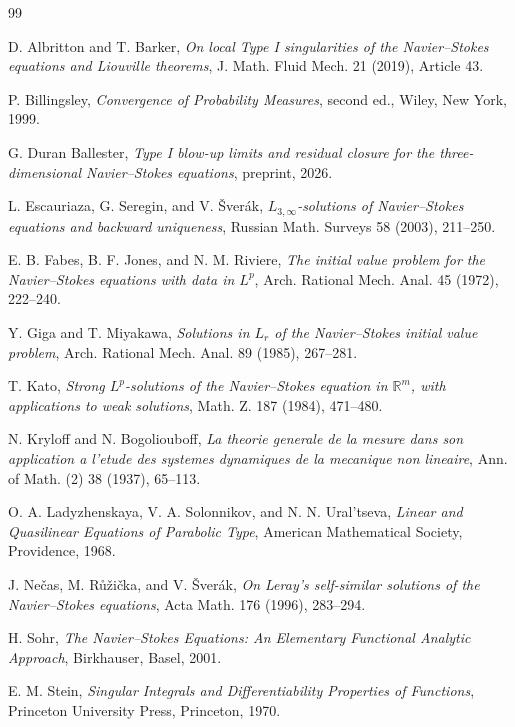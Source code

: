 \documentclass[11pt]{amsart}
\theoremstyle{plain}
\theoremstyle{definition}
\theoremstyle{remark}
\numberwithin{equation}{section}
\newcommand{\R}{\mathbb R}
\begin{document}
\begin{thebibliography}{99}

D. Albritton and T. Barker,
\emph{On local Type I singularities of the Navier--Stokes equations and
Liouville theorems},
J. Math. Fluid Mech. 21 (2019), Article 43.

P. Billingsley,
\emph{Convergence of Probability Measures}, second ed.,
Wiley, New York, 1999.

G. Duran Ballester,
\emph{Type I blow-up limits and residual closure for the
three-dimensional Navier--Stokes equations}, preprint, 2026.

L. Escauriaza, G. Seregin, and V. \v{S}ver\'ak,
\emph{\(L_{3,\infty}\)-solutions of Navier--Stokes equations and backward
uniqueness},
Russian Math. Surveys 58 (2003), 211--250.

E. B. Fabes, B. F. Jones, and N. M. Riviere,
\emph{The initial value problem for the Navier--Stokes equations with data in
\(L^p\)},
Arch. Rational Mech. Anal. 45 (1972), 222--240.

Y. Giga and T. Miyakawa,
\emph{Solutions in \(L_r\) of the Navier--Stokes initial value problem},
Arch. Rational Mech. Anal. 89 (1985), 267--281.

T. Kato,
\emph{Strong \(L^p\)-solutions of the Navier--Stokes equation in
\(\R^m\), with applications to weak solutions},
Math. Z. 187 (1984), 471--480.

N. Kryloff and N. Bogoliouboff,
\emph{La theorie generale de la mesure dans son application a l'etude des
systemes dynamiques de la mecanique non lineaire},
Ann. of Math. (2) 38 (1937), 65--113.

O. A. Ladyzhenskaya, V. A. Solonnikov, and N. N. Ural'tseva,
\emph{Linear and Quasilinear Equations of Parabolic Type},
American Mathematical Society, Providence, 1968.

J. Ne\v{c}as, M. R\r{u}\v{z}i\v{c}ka, and V. \v{S}ver\'ak,
\emph{On Leray's self-similar solutions of the Navier--Stokes equations},
Acta Math. 176 (1996), 283--294.

H. Sohr,
\emph{The Navier--Stokes Equations: An Elementary Functional Analytic
Approach},
Birkhauser, Basel, 2001.

E. M. Stein,
\emph{Singular Integrals and Differentiability Properties of Functions},
Princeton University Press, Princeton, 1970.

\end{thebibliography}
\end{document}
